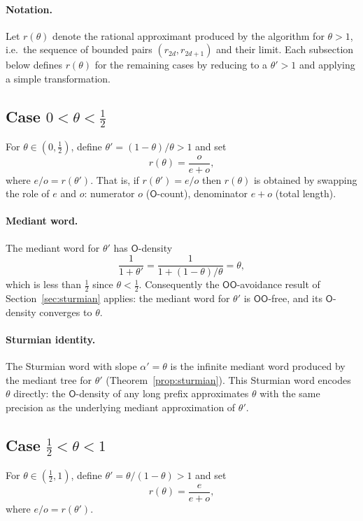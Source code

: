 \documentclass[12pt]{article}
\theoremstyle{definition}
\theoremstyle{remark}
\theoremstyle{plain}
\newcommand{\OO}{\mathsf{O}}
\begin{document}
\paragraph{Notation.}
Let $r(\theta)$ denote the rational approximant produced by the algorithm for
$\theta > 1$, i.e.\ the sequence of bounded pairs $(r_{2d}, r_{2d+1})$ and
their limit.
Each subsection below defines $r(\theta)$ for the remaining cases by reducing
to a $\theta' > 1$ and applying a simple transformation.

\subsection{Case $0 < \theta < \tfrac{1}{2}$}

For $\theta \in (0, \tfrac{1}{2})$, define $\theta' = (1-\theta)/\theta > 1$ and set
\[
  r(\theta) = \frac{o}{e + o},
\]
where $e/o = r(\theta')$.
That is, if $r(\theta') = e/o$ then $r(\theta)$ is obtained by swapping the role
of $e$ and $o$: numerator $o$ ($\OO$-count), denominator $e+o$ (total length).

\paragraph{Mediant word.}
The mediant word for $\theta'$ has $\OO$-density
\[
  \frac{1}{1 + \theta'} = \frac{1}{1 + (1-\theta)/\theta} = \theta,
\]
which is less than $\tfrac{1}{2}$ since $\theta < \tfrac{1}{2}$.
Consequently the $\OO\OO$-avoidance result of Section~\ref{sec:sturmian} applies:
the mediant word for $\theta'$ is $\OO\OO$-free, and its $\OO$-density converges
to $\theta$.

\paragraph{Sturmian identity.}
The Sturmian word with slope $\alpha' = \theta$ is the infinite mediant word
produced by the mediant tree for $\theta'$ (Theorem~\ref{prop:sturmian}).
This Sturmian word encodes $\theta$ directly: the $\OO$-density of any long prefix
approximates $\theta$ with the same precision as the underlying mediant approximation
of $\theta'$.

\subsection{Case $\tfrac{1}{2} < \theta < 1$}

For $\theta \in (\tfrac{1}{2}, 1)$, define $\theta' = \theta/(1-\theta) > 1$ and set
\[
  r(\theta) = \frac{e}{e + o},
\]
where $e/o = r(\theta')$.
\end{document}

